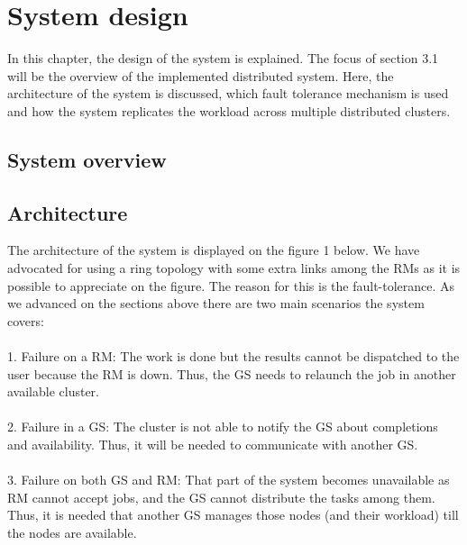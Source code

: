 \section{System design}
In this chapter, the design of the system is explained. The focus of section 3.1 will be the overview of the implemented distributed system. Here, the architecture of the system is discussed, which fault tolerance mechanism is used and how the system replicates the workload across multiple distributed clusters.
\subsection{System overview}
\subsection{Architecture}
The architecture of the system is displayed on the figure 1 below. We have advocated for using a ring topology with some extra links among the RMs as it is possible to appreciate on the figure. The reason for this is the fault-tolerance. As we advanced on the sections above there are two main scenarios the system covers:
\\\\
1. Failure on a RM: The work is done but the results cannot be dispatched to the user because the RM is down. Thus, the GS needs to relaunch the job in another available cluster.
\\\\
2. Failure in a GS: The cluster is not able to notify the GS about completions and availability. Thus, it will be needed to communicate with another GS.
\\\\
3. Failure on both GS and RM: That part of the system becomes unavailable as RM cannot accept jobs, and the GS cannot distribute the tasks among them. Thus, it is needed that another GS manages those nodes (and their workload) till the nodes are available.
\\\\